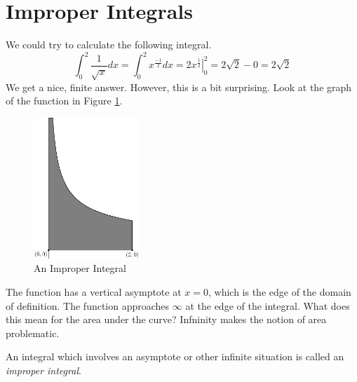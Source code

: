 \documentclass[fleqn]{report}
\begin{document}
\section{Improper Integrals}
\label{improper-integrals}

\begin{example}
We could try to calculate the following integral.
\begin{equation*}
\int_0^2 \frac{1}{\sqrt{x}} dx = \int_0^2 x^\frac{-1}{2} dx 
= \left. 2x^{\frac{1}{2}} \right|_0^2 = 2\sqrt{2} - 0 =
2\sqrt{2}
\end{equation*}
We get a nice, finite answer. However, this is a
bit surprising. Look at the graph of the function in Figure
\ref{figure-improper-integral1}.
\end{example}

\begin{figure}[ht]
\centering
\includegraphics[width=4cm]{figure08.eps}
\caption{An Improper Integral}
\label{figure-improper-integral1}
\end{figure}

The function has a vertical asymptote at $x=0$, which is the
edge of the domain of definition. The function approaches
$\infty$ at the edge of the integral. What does this mean for
the area under the curve? Infninity makes the notion of area
problematic. 

\begin{defn}
An integral which involves an asymptote or other infinite
situation is called an \emph{improper integral}. 
\end{defn}
\end{document}
